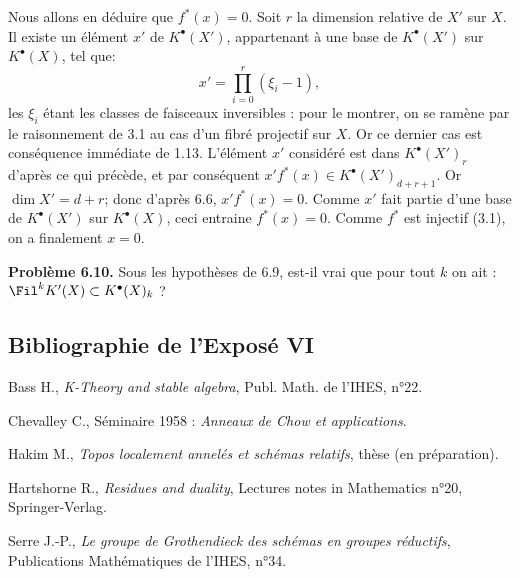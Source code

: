 Nous allons en déduire que $f^*(x)=0$. Soit $r$ la dimension relative de $X'$ sur $X$. Il existe un élément $x'$ de $K^{\bullet}(X')$, appartenant à une base de $K^{\bullet}(X')$ sur $K^{\bullet}(X)$, tel que:
\[
  x'=\prod_{i=0}^{r}(\xi_i-1),
\]
les $\xi_i$
étant les classes de faisceaux inversibles : pour le montrer, on se ramène par le raisonnement de 3.1 au cas d'un fibré projectif sur $X$. Or ce dernier cas est conséquence immédiate de 1.13. L'élément $x'$ considéré est dans $K^{\bullet}(X')_r$ d'après ce qui précède, et par conséquent $x'f^*(x)\in K^{\bullet}(X')_{d+r+1}$. Or $\dim X'=d+r$; donc d'après 6.6, $x'f^*(x)=0$. Comme $x'$ fait partie d'une base de $K^{\bullet}(X')$ sur $K^{\bullet}(X)$, ceci entraine $f^*(x)=0$. Comme $f^*$ est injectif (3.1), on a finalement $x=0$.

\textbf{Problème 6.10.} Sous les hypothèses de 6.9, est-il vrai que pour tout $k$ on ait : $\Fil^kK'(X)\subset K^{\bullet}(X)_k$ ?

\subsection*{Bibliographie de l'Exposé VI}
\begin{enumerate}[label={\textup{[\arabic*]}}]
\item Bass H., \emph{K-Theory and stable algebra}, Publ. Math. de l'IHES, n°22.
\item Chevalley C., Séminaire 1958 : \emph{Anneaux de Chow et applications}.
\item Hakim M., \emph{Topos localement annelés et schémas relatifs}, thèse (en préparation).
\item Hartshorne R., \emph{Residues and duality}, Lectures notes in Mathematics n°20, Springer-Verlag.
\item Serre J.-P., \emph{Le groupe de Grothendieck des schémas en groupes réductifs}, Publications Mathématiques de l'IHES, n°34.
\end{enumerate}



\providecommand{\Kosz}{\mathrm K}
\providecommand{\Proj}{\operatorname{Proj}}
\providecommand{\Sym}{\operatorname{Sym}}
\providecommand{\gr}{\operatorname{gr}}
\providecommand{\Tor}{\operatorname{Tor}}
\providecommand{\Spec}{\operatorname{Spec}}
\providecommand{\Imf}{\operatorname{Im}}
\providecommand{\Ker}{\operatorname{Ker}}
\providecommand{\Id}{\operatorname{Id}}
\providecommand{\rad}{\operatorname{rad}}
\providecommand{\cO}{\mathcal O}
\providecommand{\cS}{\mathcal S}
\providecommand{\cJ}{\mathcal J}
\providecommand{\cN}{\mathcal N}
\providecommand{\bfP}{\mathbf P}
\providecommand{\bfA}{\mathbf A}


